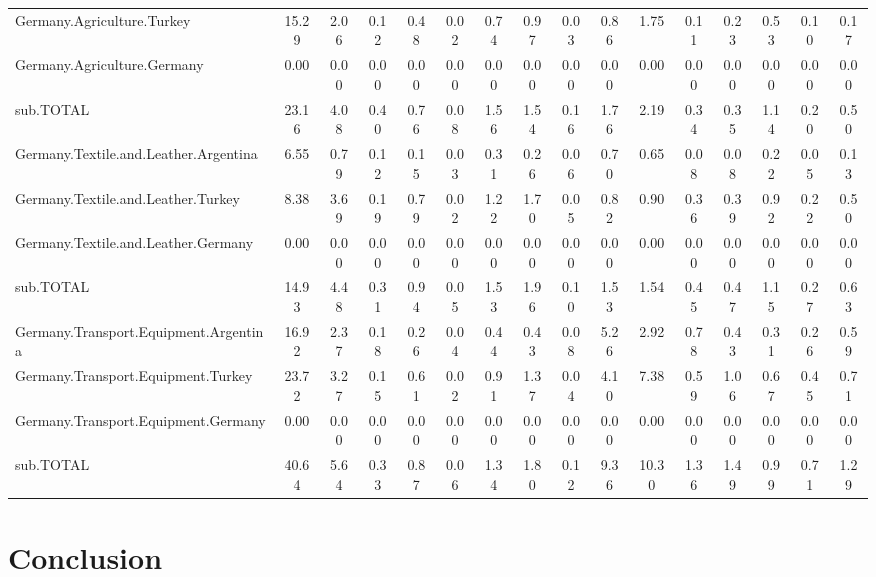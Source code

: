 \documentclass{article}\usepackage[]{graphicx}\usepackage[]{color}
\begin{document}
\begin{landscape}
\begin{table}[htbp]
\begin{adjustwidth}{-1.15in}{-1.15in}
\begin{tabular}{lccccccccccccccc}
    Germany.Agriculture.Turkey & 15.29 & 2.06  & 0.12  & 0.48  & 0.02  & 0.74  & 0.97  & 0.03  & 0.86  & 1.75  & 0.11  & 0.23  & 0.53  & 0.10  & 0.17 \\
    Germany.Agriculture.Germany & 0.00  & 0.00  & 0.00  & 0.00  & 0.00  & 0.00  & 0.00  & 0.00  & 0.00  & 0.00  & 0.00  & 0.00  & 0.00  & 0.00  & 0.00 \\
    sub.TOTAL & 23.16 & 4.08  & 0.40  & 0.76  & 0.08  & 1.56  & 1.54  & 0.16  & 1.76  & 2.19  & 0.34  & 0.35  & 1.14  & 0.20  & 0.50 \\
    Germany.Textile.and.Leather.Argentina & 6.55  & 0.79  & 0.12  & 0.15  & 0.03  & 0.31  & 0.26  & 0.06  & 0.70  & 0.65  & 0.08  & 0.08  & 0.22  & 0.05  & 0.13 \\
    Germany.Textile.and.Leather.Turkey & 8.38  & 3.69  & 0.19  & 0.79  & 0.02  & 1.22  & 1.70  & 0.05  & 0.82  & 0.90  & 0.36  & 0.39  & 0.92  & 0.22  & 0.50 \\
    Germany.Textile.and.Leather.Germany & 0.00  & 0.00  & 0.00  & 0.00  & 0.00  & 0.00  & 0.00  & 0.00  & 0.00  & 0.00  & 0.00  & 0.00  & 0.00  & 0.00  & 0.00 \\
    sub.TOTAL & 14.93 & 4.48  & 0.31  & 0.94  & 0.05  & 1.53  & 1.96  & 0.10  & 1.53  & 1.54  & 0.45  & 0.47  & 1.15  & 0.27  & 0.63 \\
    Germany.Transport.Equipment.Argentina & 16.92 & 2.37  & 0.18  & 0.26  & 0.04  & 0.44  & 0.43  & 0.08  & 5.26  & 2.92  & 0.78  & 0.43  & 0.31  & 0.26  & 0.59 \\
    Germany.Transport.Equipment.Turkey & 23.72 & 3.27  & 0.15  & 0.61  & 0.02  & 0.91  & 1.37  & 0.04  & 4.10  & 7.38  & 0.59  & 1.06  & 0.67  & 0.45  & 0.71 \\
    Germany.Transport.Equipment.Germany & 0.00  & 0.00  & 0.00  & 0.00  & 0.00  & 0.00  & 0.00  & 0.00  & 0.00  & 0.00  & 0.00  & 0.00  & 0.00  & 0.00  & 0.00 \\
    sub.TOTAL & 40.64 & 5.64  & 0.33  & 0.87  & 0.06  & 1.34  & 1.80  & 0.12  & 9.36  & 10.30 & 1.36  & 1.49  & 0.99  & 0.71  & 1.29 \\
    \bottomrule
    \end{tabular}
  \label{tab:wwz}
  \end{adjustwidth}
\end{table}
\end{landscape}

\section{Conclusion}

\printbibliography
\end{document}
